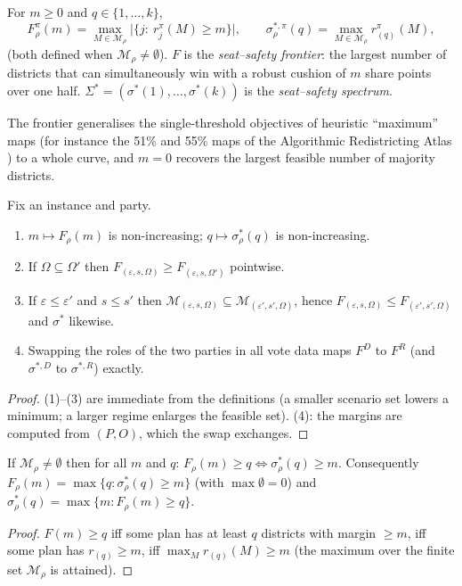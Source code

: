 \begin{definition}
For $m\ge0$ and $q\in\{1,\dots,k\}$,
\[
F^\pi_\rho(m)=\max_{M\in\mathcal M_\rho}\bigl|\{j:\ r^\pi_j(M)\ge m\}\bigr|,
\qquad
\sigma^{*,\pi}_\rho(q)=\max_{M\in\mathcal M_\rho} r^\pi_{(q)}(M),
\]
(both defined when $\mathcal M_\rho\neq\emptyset$). $F$ is the \emph{seat--safety frontier}: the largest number of districts that can simultaneously win with a robust cushion of $m$ share points over one half. $\Sigma^*=(\sigma^*(1),\dots,\sigma^*(k))$ is the \emph{seat--safety spectrum}.
\end{definition}

The frontier generalises the single-threshold objectives of heuristic ``maximum'' maps (for instance the 51\% and 55\% maps of the Algorithmic Redistricting Atlas \citep{atlas2026}) to a whole curve, and $m=0$ recovers the largest feasible number of majority districts.

\begin{proposition}\label{prop:mono}
Fix an instance and party.
\begin{enumerate}
\item $m\mapsto F_\rho(m)$ is non-increasing; $q\mapsto\sigma^*_\rho(q)$ is non-increasing.
\item If $\Omega\subseteq\Omega'$ then $F_{(\varepsilon,s,\Omega)}\ge F_{(\varepsilon,s,\Omega')}$ pointwise.
\item If $\varepsilon\le\varepsilon'$ and $s\le s'$ then $\mathcal M_{(\varepsilon,s,\Omega)}\subseteq\mathcal M_{(\varepsilon',s',\Omega)}$, hence $F_{(\varepsilon,s,\Omega)}\le F_{(\varepsilon',s',\Omega)}$ and $\sigma^*$ likewise.
\item Swapping the roles of the two parties in all vote data maps $F^D$ to $F^R$ (and $\sigma^{*,D}$ to $\sigma^{*,R}$) exactly.
\end{enumerate}
\end{proposition}
\begin{proof}
(1)--(3) are immediate from the definitions (a smaller scenario set lowers a minimum; a larger regime enlarges the feasible set). (4): the margins are computed from $(P,O)$, which the swap exchanges.
\end{proof}

\begin{theorem}\label{thm:duality}
If $\mathcal M_\rho\neq\emptyset$ then for all $m$ and $q$: $F_\rho(m)\ge q\iff\sigma^*_\rho(q)\ge m$. Consequently $F_\rho(m)=\max\{q:\sigma^*_\rho(q)\ge m\}$ (with $\max\emptyset=0$) and $\sigma^*_\rho(q)=\max\{m: F_\rho(m)\ge q\}$.
\end{theorem}
\begin{proof}
$F(m)\ge q$ iff some plan has at least $q$ districts with margin $\ge m$, iff some plan has $r_{(q)}\ge m$, iff $\max_M r_{(q)}(M)\ge m$ (the maximum over the finite set $\mathcal M_\rho$ is attained).
\end{proof}

